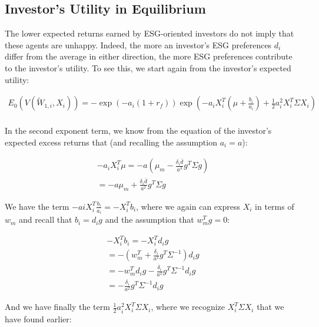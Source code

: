 \subsection{Investor's Utility in Equilibrium}

The lower expected returns earned by ESG-oriented investors 
do not imply that these agents are unhappy. Indeed, 
the more an investor's ESG preferences $d_i$ differ from the 
average in either direction, the more 
ESG preferences contribute to the investor's utility.
To see this, we start again from the investor's expected utility:


\begin{equation}
    \begin{aligned}
    E_0(V(\tilde{W}_{1,i}, X_i)) = 
     -\exp{(-a_i (1 + r_f))} \exp{(-a_i X_i^T (\mu + \frac{b_i}{a_i})+\frac{1}{2}a_i^2 X_i^T \Sigma X_i)} \\
    \end{aligned}
\end{equation}

In the second exponent term, we know from the equation 
of the investor's expected excess returns that (and recalling the assumption $a_i = a$):

\begin{equation}
    \begin{aligned}
    -a_iX_i^T \mu = -a (\mu_m - \frac{\delta_i \bar{d}}{a^3} g^T \Sigma g) \\
    = -a \mu_m + \frac{\delta_i \bar{d}}{a^2} g^T \Sigma g
    \end{aligned}
\end{equation}

We have the term $-ai X_i^T \frac{b_i}{a_i} = -X_i^T b_i$, where we 
again can express $X_i$ in terms of $w_m$ and recall that $b_i = d_i g$ and 
the assumption that $w_m^T g = 0$:

\begin{equation}
    \begin{aligned}
    -X_i^T b_i = -X_i^T d_i g \\
    = - (w_m^T + \frac{\delta_i}{a^2} g^T \Sigma^{-1}) d_i g \\
    = -w_m^T d_i g - \frac{\delta_i}{a^2} g^T \Sigma^{-1} d_i g \\
    = - \frac{\delta_i}{a^2} g^T \Sigma^{-1} d_i g
    \end{aligned}
\end{equation}

And we have finally the term $\frac{1}{2}a_i^2 X_i^T \Sigma X_i$,
where we recognize $X_i^T \Sigma X_i$ that we have found earlier:


